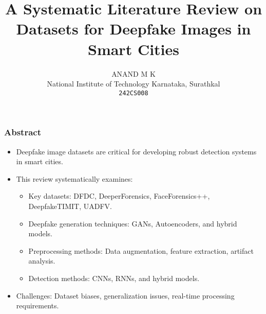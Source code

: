 \documentclass{beamer}
\title{A Systematic Literature Review on Datasets for Deepfake Images in Smart Cities}
\author{ANAND M K \\ National Institute of Technology Karnataka, Surathkal \\ \texttt{242CS008}}
\date{}
\begin{document}
\begin{frame}
    \titlepage
\end{frame}

\begin{frame}
    \frametitle{Abstract}
    \begin{itemize}
        \item Deepfake image datasets are critical for developing robust detection systems in smart cities.
        \item This review systematically examines:
            \begin{itemize}
                \item Key datasets: DFDC, DeeperForensics, FaceForensics++, DeepfakeTIMIT, UADFV.
                \item Deepfake generation techniques: GANs, Autoencoders, and hybrid models.
                \item Preprocessing methods: Data augmentation, feature extraction, artifact analysis.
                \item Detection methods: CNNs, RNNs, and hybrid models.
            \end{itemize}
        \item Challenges: Dataset biases, generalization issues, real-time processing requirements.
    \end{itemize}
\end{frame}
\end{document}
